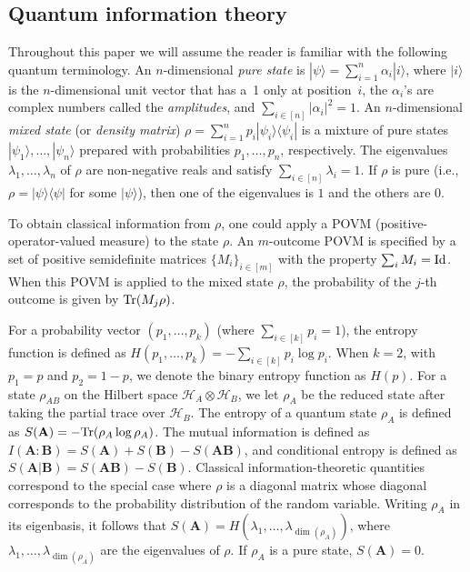 \documentclass[twoside,11pt]{article}
\newcommand{\ket}[1]{|#1\rangle}
\newcommand{\ketbra}[2]{|#1\rangle\! \langle #2|}
\newcommand{\Tr}{\mbox{\rm Tr}}
\newcommand{\Id}{\ensuremath{\mathop{\rm Id}\nolimits}}
\newcommand{\Hi}{\ensuremath{\mathcal{H}}}
\begin{document}
\subsection{Quantum information theory}
Throughout this paper we will assume the reader is familiar with the following quantum terminology. An $n$-dimensional \emph{pure state} is $\ket{\psi}=\sum_{i=1}^n \alpha_i \ket{i}$, where $\ket{i}$ is the $n$-dimensional unit vector that has a~1 only at position~$i$, the $\alpha_i$'s are complex numbers called the \emph{amplitudes}, and $\sum_{i\in [n]}|\alpha_i|^2=1$. An $n$-dimensional \emph{mixed state} (or \emph{density matrix}) $\rho=\sum_{i=1}^n p_i\ketbra{\psi_i}{\psi_i}$ is a mixture of pure states $\ket{\psi_1},\ldots,\ket{\psi_n}$ prepared with probabilities $p_1,\ldots,p_n$, respectively. The eigenvalues $\lambda_1,\ldots,\lambda_n$ of $\rho$ are non-negative reals and satisfy $\sum_{i\in [n]}\lambda_i=1$. If $\rho$ is pure (i.e., $\rho=\ketbra{\psi}{\psi}$ for some $\ket{\psi}$), then one of the eigenvalues is $1$ and the others are $0$.

To obtain classical information from $\rho$, one could apply a POVM (positive-operator-valued measure) to the state $\rho$. An $m$-outcome POVM is specified by a set of positive semidefinite  matrices $\{M_i\}_{i\in [m]}$ with the property $\sum_{i} M_i= \Id$. When this POVM is applied to the mixed state $\rho$, the probability of the $j$-th outcome is given by $\Tr(M_j\rho)$.

For a probability vector $(p_1,\ldots,p_k)$ (where $\sum_{i\in [k]} p_i=1$), the entropy function is defined as $H(p_1,\ldots,p_k)=-\sum_{i\in [k]} p_i\log p_i$. When $k=2$, with $p_1=p$ and $p_2=1-p$, we denote the binary entropy function as $H(p)$. For a state $\rho_{AB}$ on the Hilbert space $\Hi_A \otimes \Hi_B$, we let $\rho_A$ be the reduced state after taking the partial trace over $\Hi_B$.  The entropy of a quantum state $\rho_A$ is defined as $S(\mathbf{A})=-\Tr(\rho_{A} \log \rho_{A})$. The mutual information is defined as $I(\mathbf{A}:\mathbf{B})=S(\textbf{A})+S(\textbf{B})-S(\textbf{A}\textbf{B})$, and conditional entropy is defined as $S(\textbf{A}|\textbf{B})=S(\textbf{A}\textbf{B})-S(\textbf{B})$. Classical information-theoretic quantities correspond to the special case where $\rho$ is a diagonal matrix whose diagonal corresponds to the probability distribution of the random variable. Writing $\rho_A$ in its eigenbasis, it follows that $S(\mathbf{A})=H(\lambda_1,\ldots, \lambda_{\dim(\rho_A)})$, where $\lambda_1,\ldots,\lambda_{\dim(\rho_A)}$ are the eigenvalues of $\rho$. If $\rho_A$ is a pure state, $S(\mathbf{A})=0$.
\end{document}

